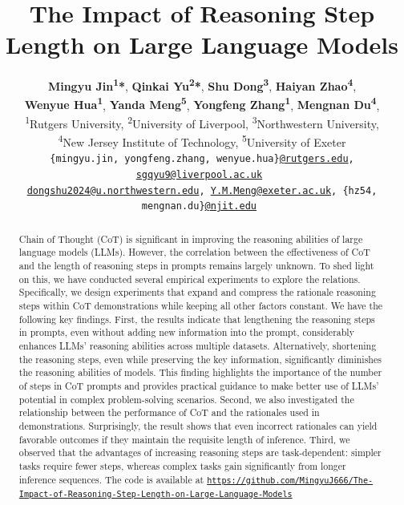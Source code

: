 \documentclass[11pt]{article}
\title{The Impact of Reasoning Step Length on Large Language Models}
\author{
 \textbf{Mingyu Jin\textsuperscript{1}*},
 \textbf{Qinkai Yu\textsuperscript{2}*},
 \textbf{Shu Dong\textsuperscript{3}},
 \textbf{Haiyan Zhao\textsuperscript{4}},
\\
 \textbf{Wenyue Hua\textsuperscript{1}},
 \textbf{Yanda Meng\textsuperscript{5}},
 \textbf{Yongfeng Zhang\textsuperscript{1}},
 \textbf{Mengnan Du\textsuperscript{4}},
\\
 \textsuperscript{1}Rutgers University,
 \textsuperscript{2}University of Liverpool,
 \textsuperscript{3}Northwestern University,\\
 \textsuperscript{4}New Jersey Institute of Technology,
 \textsuperscript{5}University of Exeter
\\
 \small{
 \texttt{\{mingyu.jin, yongfeng.zhang, wenyue.hua\}\href{mailto:@rutgers.edu}{@rutgers.edu}, \href{mailto:sgqyu9@liverpool.ac.uk}{sgqyu9@liverpool.ac.uk}
 }}
 \\
 \small\texttt{{\href{mailto:dongshu2024@u.northwestern.edu}{dongshu2024@u.northwestern.edu}, \href{mailto:Y.M.Meng@exeter.ac.uk}{Y.M.Meng@exeter.ac.uk}, 
 \{hz54, mengnan.du\}\href{mailto:@njit.edu}{@njit.edu}
 }}
}
\begin{document}
\maketitle
\begin{abstract}
Chain of Thought (CoT) is significant in improving the reasoning abilities of large language models (LLMs). However, the correlation between the effectiveness of CoT and the length of reasoning steps in prompts remains largely unknown. To shed light on this, we have conducted several empirical experiments to explore the relations. Specifically, we design experiments that expand and compress the rationale reasoning steps within CoT demonstrations while keeping all other factors constant. We have the following key findings. First, the results indicate that lengthening the reasoning steps in prompts, even without adding new information into the prompt, considerably enhances LLMs' reasoning abilities across multiple datasets. Alternatively, shortening the reasoning steps, even while preserving the key information, significantly diminishes the reasoning abilities of models. This finding highlights the importance of the number of steps in CoT prompts and provides practical guidance to make better use of LLMs' potential in complex problem-solving scenarios. Second, we also investigated the relationship between the performance of CoT and the rationales used in demonstrations. Surprisingly, the result shows that even incorrect rationales can yield favorable outcomes if they maintain the requisite length of inference. Third, we observed that the advantages of increasing reasoning steps are task-dependent: simpler tasks require fewer steps, whereas complex tasks gain significantly from longer inference sequences. The code is available at
\href{https://github.com/MingyuJ666/The-Impact-of-Reasoning-Step-Length-on-Large-Language-Models}{%
    \nolinkurl{https://github.com/MingyuJ666/The-Impact-of-Reasoning-Step-Length-on-Large-Language-Models}
}


\end{abstract}
\end{document}
